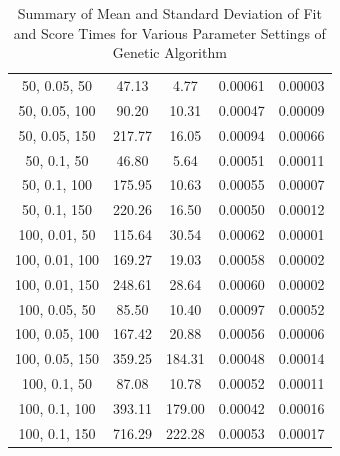\documentclass{article}
\begin{document}
\begin{table}[H]
{\begin{tabular}{|c|c|c|c|c|}
                50, 0.05, 50               & 47.13                  & 4.77                  & 0.00061                  & 0.00003                 \\
                50, 0.05, 100              & 90.20                  & 10.31                 & 0.00047                  & 0.00009                 \\
                50, 0.05, 150              & 217.77                 & 16.05                 & 0.00094                  & 0.00066                 \\
                50, 0.1, 50                & 46.80                  & 5.64                  & 0.00051                  & 0.00011                 \\
                50, 0.1, 100               & 175.95                 & 10.63                 & 0.00055                  & 0.00007                 \\
                50, 0.1, 150               & 220.26                 & 16.50                 & 0.00050                  & 0.00012                 \\
                100, 0.01, 50              & 115.64                 & 30.54                 & 0.00062                  & 0.00001                 \\
                100, 0.01, 100             & 169.27                 & 19.03                 & 0.00058                  & 0.00002                 \\
                100, 0.01, 150             & 248.61                 & 28.64                 & 0.00060                  & 0.00002                 \\
                100, 0.05, 50              & 85.50                  & 10.40                 & 0.00097                  & 0.00052                 \\
                100, 0.05, 100             & 167.42                 & 20.88                 & 0.00056                  & 0.00006                 \\
                100, 0.05, 150             & 359.25                 & 184.31                & 0.00048                  & 0.00014                 \\
                100, 0.1, 50               & 87.08                  & 10.78                 & 0.00052                  & 0.00011                 \\
                100, 0.1, 100              & 393.11                 & 179.00                & 0.00042                  & 0.00016                 \\
                100, 0.1, 150              & 716.29                 & 222.28                & 0.00053                  & 0.00017                 \\
                \hline
            \end{tabular}
        }
        \caption{Summary of Mean and Standard Deviation of Fit and Score Times for Various Parameter Settings of Genetic Algorithm}
        \label{tab:ga_summary_fit_score_times}
    \end{table}
\end{document}
